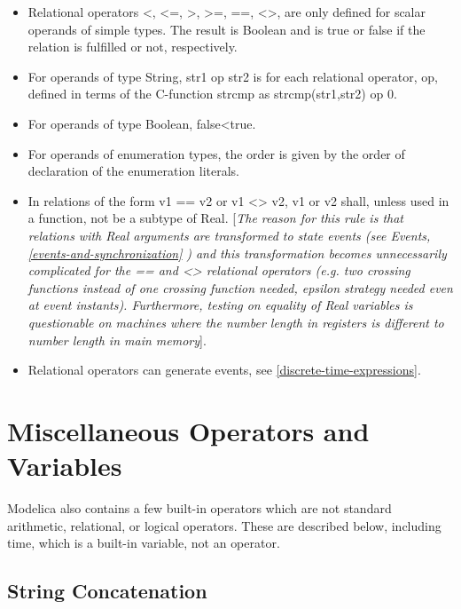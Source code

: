 \documentclass[10pt,a4paper]{report}
\def\doublelabel#1{\label{#1}}
\begin{document}
\begin{itemize}
\item
  Relational operators \textless{}, \textless{}=, \textgreater{},
  \textgreater{}=, ==, \textless{}\textgreater{}, are only defined for
  scalar operands of simple types. The result is Boolean and is true or
  false if the relation is fulfilled or not, respectively.
\item
  For operands of type String, str1 op str2 is for each relational
  operator, op, defined in terms of the C-function strcmp as
  strcmp(str1,str2) op 0.
\item
  For operands of type Boolean, false\textless{}true.
\item
  For operands of enumeration types, the order is given by the order of
  declaration of the enumeration literals.
\item
  In relations of the form v1 == v2 or v1 \textless{}\textgreater{} v2,
  v1 or v2 shall, unless used in a function, not be a subtype of Real.
  {[}\emph{The reason for this rule is that relations with Real
  arguments are transformed to state events (see Events, \ref{events-and-synchronization}}
  \emph{) and this transformation becomes unnecessarily complicated
  for the == and \textless{}\textgreater{} relational operators (e.g.
  two crossing functions instead of one crossing function needed,
  epsilon strategy needed even at event instants). Furthermore, testing
  on equality of Real variables is questionable on machines where the
  number length in registers is different to number length in main
  memory}{]}.
\item
  Relational operators can generate events, see \ref{discrete-time-expressions}.
\end{itemize}

\section{Miscellaneous Operators and Variables}\doublelabel{miscellaneous-operators-and-variables}

Modelica also contains a few built-in operators which are not standard
arithmetic, relational, or logical operators. These are described below,
including time, which is a built-in variable, not an operator.

\subsection{String Concatenation}\doublelabel{string-concatenation}
\end{document}
